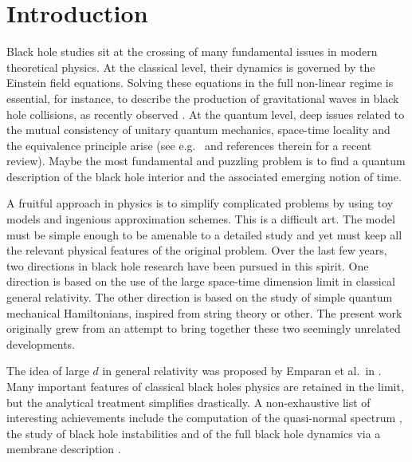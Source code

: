 \documentclass[12pt]{article}
\numberwithin{equation}{section}
\begin{document}

%
\section{\label{s1Sec} Introduction}
%

Black hole studies sit at the crossing of many fundamental issues in modern theoretical physics. At the classical level, their dynamics is governed by the Einstein field equations. Solving these equations in the full non-linear regime is essential, for instance, to describe the production of gravitational waves in black hole collisions, as recently observed \cite{gravwaves}. At the quantum level, deep issues related to the mutual consistency of unitary quantum mechanics, space-time locality and the equivalence principle arise (see e.g.\ \cite{Polrev1} and references therein for a recent review). Maybe the most fundamental and puzzling problem is to find a quantum description of the black hole interior and the associated emerging notion of time.

A fruitful approach in physics is to simplify complicated problems by using toy models and ingenious approximation schemes. This is a difficult art. The model must be simple enough to be amenable to a detailed study and yet must keep all the relevant physical features of the original problem. Over the last few years, two directions in black hole research have been pursued in this spirit. One direction is based on the use of the large space-time dimension limit in classical general relativity. The other direction is based on the study of simple quantum mechanical Hamiltonians, inspired from string theory or other. The present work originally grew from an attempt to bring together these two seemingly unrelated developments.

The idea of large $d$ in general relativity was proposed by Emparan et al.\ in \cite{Emparan}. Many important features of classical black holes physics are retained in the limit, but the analytical treatment simplifies drastically. A non-exhaustive list of interesting achievements include the computation of the quasi-normal spectrum \cite{EmparanQN}, the study of black hole instabilities \cite{EmparanINST} and of the full black hole dynamics via a membrane description \cite{EmparanDYN}.
\end{document}
